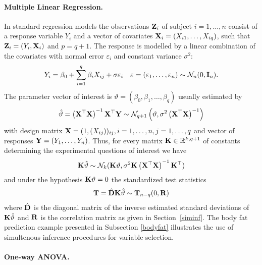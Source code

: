 \documentclass[12pt]{article}
\begin{document}
\paragraph{Multiple Linear Regression.}

In standard regression models the observations $\mathbf{Z}_i$ of subject
$i=1, \ldots, n$ consist of a response variable $Y_i$ and a
vector of covariates $\mathbf{X}_i = (X_{i1}, \dots, X_{iq})$, such that
$\mathbf{Z}_i = (Y_i, \mathbf{X}_i)$ and $p = q + 1$. The response is modelled by a linear
combination of the covariates with normal error $\varepsilon_i$ and
constant variance $\sigma^2$:
\begin{eqnarray*}
Y_i = \beta_0 + \sum_{i = 1}^q \beta_i X_{ij} + \sigma \varepsilon_i \quad 
      \varepsilon = (\varepsilon_1, \dots, \varepsilon_n) \sim \mathcal{N}_n(0, \mathbf{I}_n).
\end{eqnarray*}
The parameter vector of interest is $\vartheta = (\beta_0, \beta_1, \dots, \beta_q)$
usually estimated by 
\begin{eqnarray*}
\hat{\vartheta} = \left(\mathbf{X}^\top\mathbf{X}\right)^{-1} \mathbf{X}^\top \mathbf{Y} 
\sim \mathcal{N}_{q+1}\left(\vartheta, \sigma^2 \left(\mathbf{X}^\top\mathbf{X}\right)^{-1}\right)
\end{eqnarray*}
with design matrix $\mathbf{X} = (1, (X_{ij}))_{ij}, i = 1, \dots, n, j = 1, \dots, q$ and
vector of responses $\mathbf{Y} = (Y_1, \dots, Y_n)$. 
Thus, for every matrix $\mathbf{K} \in \mathbb{R}^{k,q+1}$ of   
constants determining the experimental questions of interest we   
have
\begin{eqnarray*}
\mathbf{K} \hat{\vartheta} \sim \mathcal{N}_k(\mathbf{K} \vartheta, \sigma^2 \mathbf{K} \left(\mathbf{X}^\top\mathbf{X}\right)^{-1}
\mathbf{K}^\top)
\end{eqnarray*}
and under the hypothesis $\mathbf{K} \vartheta = 0$ the standardized test statistics
\begin{eqnarray*}
\mathbf{T} = \hat{\mathbf{D}} \mathbf{K} \hat{\vartheta} \sim \mathbf{T}_{n - q}(0, \mathbf{R})
\end{eqnarray*}
where $\hat{\mathbf{D}}$ is the diagonal matrix of the inverse estimated 
standard deviations of $\mathbf{K} \hat{\vartheta}$ and $\mathbf{R}$ is the correlation matrix
as given in Section~\ref{siminf}. The body fat prediction example
presented in Subsection \ref{bodyfat} illustrates the use of simultenous
inference procedures for variable selection.

\paragraph{One-way ANOVA.}
\end{document}
